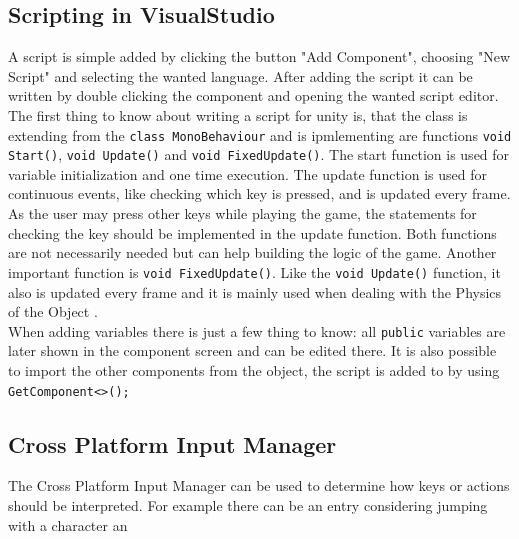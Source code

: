 \documentclass[conference]{IEEEtran}
\begin{document}
\lstset{language=[Sharp]C}

\subsection{Scripting in VisualStudio}

A script is simple added by clicking the button "Add Component", choosing "New Script" and selecting the wanted language. After adding the script it can be written by double clicking the component and opening the wanted script editor. \\
The first thing to know about writing a script for unity is, that the class is extending from the \lstinline!class MonoBehaviour! and is ipmlementing are functions \lstinline!void Start()!, \lstinline!void Update()! and \lstinline!void FixedUpdate()!. 
The start function is used for variable initialization and one time execution.
The update function is used for continuous events, like checking which key is pressed, and is updated every frame\cite{b1}. As the user may press other keys while playing the game, the statements for checking the key should be implemented in the update function. Both functions are not necessarily needed but can help building the logic of the game.
Another important function is \lstinline!void FixedUpdate()!. Like the \lstinline!void Update()! function, it also is updated every frame and it is mainly used when dealing with the Physics of the Object \cite{b1}. \\
When adding variables there is just a few thing to know: all \lstinline!public! variables are later shown in the component screen and can be edited there. It is also possible to import the other components from the object, the script is added to by using \lstinline!GetComponent<>();!



\subsection{Cross Platform Input Manager}

The Cross Platform Input Manager can be used to determine how keys or actions should be interpreted. For example there can be an entry considering jumping with a character an
\end{document}
